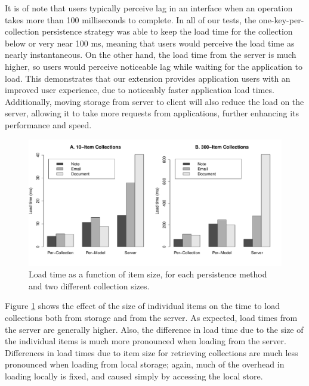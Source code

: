 \documentclass[12pt]{article}
\begin{document}
It is of note that users typically perceive lag in an interface when an
operation takes more than 100 milliseconds to complete. In all of our tests,
the one-key-per-collection persistence strategy was able to keep the load time for the
collection below or very near 100 ms, meaning that users would perceive the
load time as nearly instantaneous. On the other hand, the load time from the server is much
higher, so users would perceive noticeable lag while waiting for the application
to load. This demonstrates that our extension provides application users with
an improved user experience, due to noticeably faster application load times. Additionally, moving storage from server to client will also reduce the load on the server, allowing it to take more requests from applications, further enhancing its performance and speed.

\begin{figure}[th]
  \centering
  \includegraphics[width=\textwidth]{bars.pdf}
  \caption{Load time as a function of item size, for each persistence method
  and two different collection sizes.}
  \label{fig:bar}
\end{figure}

Figure \ref{fig:bar} shows the effect of the size of individual items on the
time to load collections both from storage and from the server. As expected,
load times from the server are generally higher. Also, the difference in load
time due to the size of the individual items is much more pronounced when
loading from the server. Differences in load times due to item size for
retrieving collections are much less pronounced when loading from local
storage; again, much of the overhead in loading locally is fixed, and caused
simply by accessing the local store.
\end{document}
